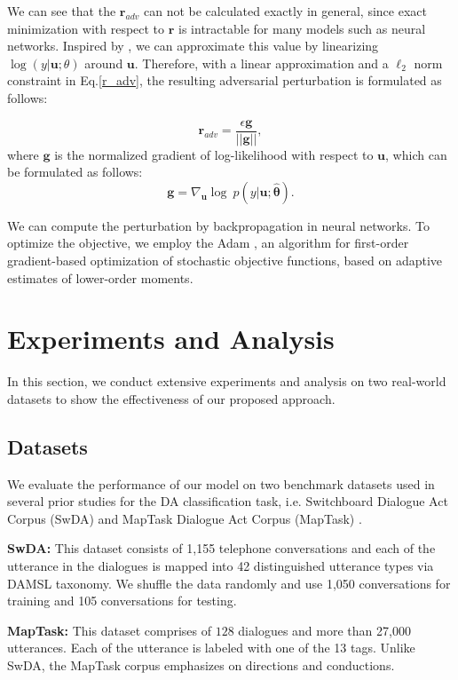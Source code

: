 \documentclass[conference]{IEEEtran}
\begin{document}
	We can see that the $\mathbf{r}_{adv}$ can not be calculated exactly in general, since exact minimization with respect to $\mathbf{r}$ is intractable for many models such as neural networks. Inspired by \cite{goodfellow2015explaining}, we can approximate this value by linearizing $\log (y|\mathbf{u};\theta)$ around $\mathbf{u}$. Therefore, with a linear approximation and a $\ell_2$ norm constraint in Eq.\ref{r_adv}, the resulting adversarial perturbation is formulated as follows:
	
	\begin{equation}
	\mathbf{r}_{adv} = \frac{\epsilon \mathbf{g}}{||\mathbf{g}||},
	\end{equation}
	where $\mathbf{g}$ is the normalized gradient of log-likelihood with respect to $\mathbf{u}$, which can be formulated as follows:
	\begin{equation}
	\mathbf{g}=\nabla_\mathbf{u}\log\ p(y|\mathbf{u};\hat{\mathbf{\theta}}).
	\end{equation}
	
We can compute the perturbation by backpropagation in neural networks.  
	To optimize the objective, we employ the Adam \cite{kingma2014adam}, an algorithm for first-order gradient-based optimization of stochastic objective functions, based on adaptive estimates of lower-order moments.
	
	\section{Experiments and Analysis}\label{sec_experiments}
	In this section, we conduct extensive experiments and analysis on two real-world datasets to show the effectiveness of our proposed approach. 
	\subsection{Datasets}  
	We evaluate the performance of our model on two benchmark datasets used in several prior studies for the DA classification task, i.e.  Switchboard Dialogue Act Corpus (SwDA) \cite{godfrey1992switchboard} and MapTask Dialogue Act Corpus (MapTask) \cite{anderson1991hcrc}.  

	\textbf{SwDA:} This dataset consists of 1,155 telephone conversations and each of the utterance in the dialogues is mapped into 42 distinguished utterance types via DAMSL taxonomy. We shuffle the data randomly and use 1,050 conversations for training and 105 conversations for testing. 

	\textbf{MapTask:} This dataset comprises of $128$ dialogues and more than 27,000 utterances. Each of the utterance is labeled with one of the 13 tags. Unlike SwDA, the MapTask corpus emphasizes on directions and conductions.
\end{document}
